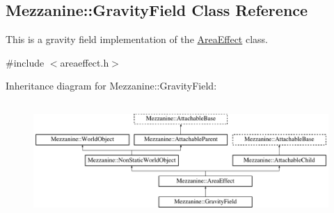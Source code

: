 \hypertarget{classMezzanine_1_1GravityField}{
\subsection{Mezzanine::GravityField Class Reference}
\label{classMezzanine_1_1GravityField}
}


This is a gravity field implementation of the \hyperlink{classMezzanine_1_1AreaEffect}{AreaEffect} class.  




{\ttfamily \#include $<$areaeffect.h$>$}

Inheritance diagram for Mezzanine::GravityField:\begin{figure}[H]
\begin{center}
\leavevmode
\includegraphics[height=4.423381cm]{classMezzanine_1_1GravityField}
\end{center}
\end{figure}
